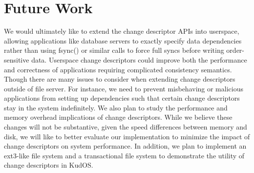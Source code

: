 \preparagraphspacing{}
\section*{Future Work}
\label{sec:future}

We would ultimately like to extend the change descriptor APIs into
userspace, allowing applications like database servers to exactly
specify data dependencies rather than using fsync() or similar calls
to force full syncs before writing order-sensitive data. Userspace
change descriptors could improve both the performance and correctness
of applications requiring complicated consistency semantics. Though
there are many issues to consider when extending change descriptors
outside of file server. For instance, we need to prevent misbehaving
or malicious applications from setting up dependencies such that
certain change descriptors stay in the system indefinitely. We also
plan to study the performance and memory overhead implications of
change descriptors. While we believe these changes will not be
substantive, given the speed differences between memory and disk,
we will like to better evaluate our implementation to minimize the
impact of change descriptors on system performance. In addition, we
plan to implement an ext3-like file system and a transactional file
system to demonstrate the utility of change descriptors in KudOS.
